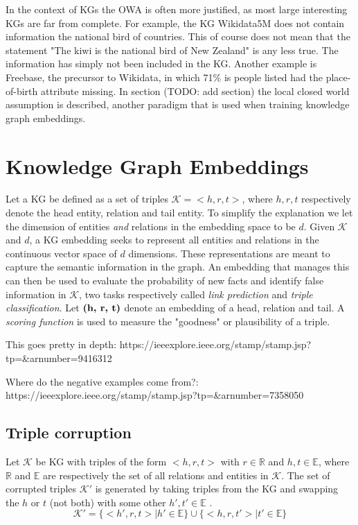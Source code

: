 In the context of KGs the OWA is often more justified, as most large interesting KGs are far from complete. For example, the KG Wikidata5M does not contain information the national bird of countries. This of course does not mean that the statement "The kiwi is the national bird of New Zealand" is any less true. The information has simply not been included in the KG. Another example is Freebase, the precursor to Wikidata, in which 71\% is people listed had the place-of-birth attribute missing. In section (TODO: add section) the local closed world assumption is described, another paradigm that is used when training knowledge graph embeddings.


\section{Knowledge Graph Embeddings}
Let a KG be defined as a set of triples $\mathcal{K}={<h, r, t>}$, where $h, r, t$ respectively denote the head entity, relation and tail entity. To simplify the explanation we let the dimension of entities \emph{and} relations in the embedding space to be $d$.
Given $\mathcal{K}$ and $d$, a KG embedding seeks to represent all entities and relations in the continuous vector space of $d$ dimensions. These representations are meant to capture the semantic information in the graph. An embedding that manages this can then be used to evaluate the probability of new facts and identify false information in $\mathcal{K}$, two tasks respectively called \textit{link prediction} and \textit{triple classification}. Let $\text{\textbf{(h, r, t)}}$ denote an embedding of a head, relation and tail. A \textit{scoring function} is used to measure the "goodness" or plausibility of a triple.

This goes pretty in depth: https://ieeexplore.ieee.org/stamp/stamp.jsp?tp=&arnumber=9416312


Where do the negative examples come from?: https://ieeexplore.ieee.org/stamp/stamp.jsp?tp=&arnumber=7358050
\subsection{Triple corruption}
Let $\mathcal{K}$ be KG with triples of the form $<h, r, t>$ with $r\in \mathbb{R}$ and $h, t \in \mathbb{E}$, where $\mathbb{R}$ and $\mathbb{E}$ are respectively the set of all relations and entities in $\mathcal{K}$. The set of corrupted triples $\mathcal{K'}$ is generated by taking triples from the KG and swapping the $h$ or $t$ (not both) with some other $h', t' \in \mathbb{E}$ \cite{TransE}.
\begin{equation}
   \mathcal{K'} =\{<h', r, t> |h' \in \mathbb{E} \} \cup \{<h, r , t'> | t' \in \mathbb{E}\}
\end{equation}



